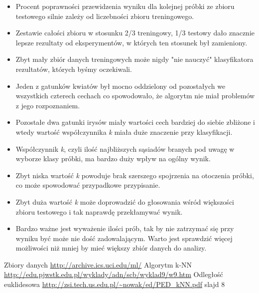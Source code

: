 \documentclass[12pt]{article}
\begin{document}
\begin{itemize}
\item{Procent poprawności przewidzenia wyniku dla kolejnej próbki ze zbioru testowego silnie zależy od liczebności zbioru treningowego.}
\item{Zestawie całości zbioru w stosunku 2/3 treningowy, 1/3 testowy dało znacznie lepsze rezultaty od eksperymentów, w których ten stosunek był zamieniony.}
\item{Zbyt mały zbiór danych treningowych może nigdy "nie nauczyć" klasyfikatora rezultatów, których byśmy oczekiwali.}
\item{Jeden z gatunków kwiatów był mocno oddzielony od pozostałych we wszystkich czterech cechach co spowodowało, że algorytm nie miał problemów z jego rozpoznaniem.}
\item{Pozostałe dwa gatunki irysów miały wartości cech bardziej do siebie zbliżone i wtedy wartość współczynnika \textit{k} miała duże znaczenie przy klasyfikacji.}
\item{Współczynnik \textit{k}, czyli ilość najbliższych sąsiadów branych pod uwagę w wyborze klasy próbki, ma bardzo duży wpływ na ogólny wynik.}
\item{Zbyt niska wartość \textit{k} powoduje brak szerszego spojrzenia na otoczenia próbki, co może spowodować przypadkowe przypisanie.}
\item{Zbyt duża wartość \textit{k} może doprowadzić do głosowania wśród większości zbioru testowego i tak naprawdę przekłamywać wynik.}
\item{Bardzo ważne jest wyważenie ilości prób, tak by nie zatrzymać się przy wyniku być może nie dość zadowalającym. Warto jest sprawdzić więcej możliwości niż mniej by mieć większy zbiór danych do analizy.}
\end{itemize}

\begin{thebibliography}{99}
Zbiory danych \url{http://archive.ics.uci.edu/ml/}
Algorytm k-NN \url{http://edu.pjwstk.edu.pl/wyklady/adn/scb/wyklad9/w9.htm}
Odległość euklidesowa \url{http://zsi.tech.us.edu.pl/~nowak/ed/PED_kNN.pdf} slajd 8


\end{thebibliography}
\end{document}
